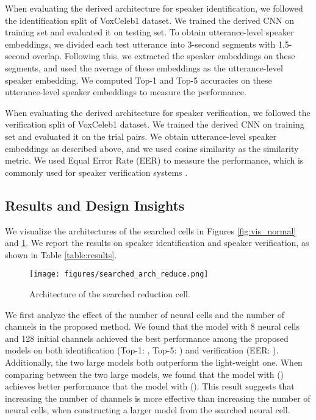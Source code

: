 \documentclass[a4paper]{article}
\begin{document}
When evaluating the derived architecture for speaker identification, we followed the identification split of VoxCeleb1 dataset. We trained the derived CNN on training set and evaluated it on testing set. To obtain utterance-level speaker embeddings, we divided each test utterance into 3-second segments with 1.5-second overlap. Following this, we extracted the speaker embeddings on these segments, and used the average of these embeddings as the utterance-level speaker embedding. We computed Top-1 and Top-5 accuracies on these utterance-level speaker embeddings to measure the performance.

When evaluating the derived architecture for speaker verification, we followed the verification split of VoxCeleb1 dataset. We trained the derived CNN on training set and evaluated it on the trial pairs. We obtain utterance-level speaker embeddings as described above, and we used cosine similarity as the similarity metric. We used Equal Error Rate (EER) to measure the performance, which is commonly used for speaker verification systems \cite{nagrani2017voxceleb}.

\subsection{Results and Design Insights}

We visualize the architectures of the searched cells in Figures \ref{fig:vis_normal} and \ref{fig:vis_reduce}. We report the results on speaker identification and speaker verification, as shown in Table \ref{table:results}. 

\begin{figure}[h]
	\vspace{0.5em}
	\centering
	\texttt{[image: figures/searched\_arch\_reduce.png]}
	\caption{Architecture of the searched reduction cell.}
	\label{fig:vis_reduce}
	\vspace{-1em}
\end{figure}


We first analyze the effect of the number of neural cells and the number of channels in the proposed method. We found that the model with 8 neural cells and 128 initial channels achieved the best performance among the proposed models on both identification (Top-1: , Top-5: ) and verification (EER: ). Additionally, the two large models both outperform the light-weight one. When comparing between the two large models, we found that the model with () achieves better performance that the model with (). This result suggests that increasing the number of channels is more effective than increasing the number of neural cells, when constructing a larger model from the searched neural cell.
\end{document}
